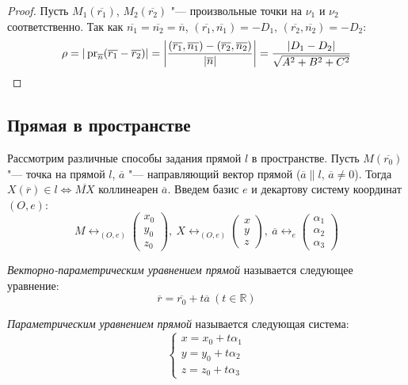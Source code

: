 \begin{proof}
	Пусть $M_1(\overline{r_1})$, $M_2(\overline{r_2})$ "--- произвольные точки на $\nu_1$ и $\nu_2$ соответственно. Так как $\overline{n_1} = \overline{n_2} = \overline{n}$, $(\overline{r_1}, \overline{n_1}) = -D_1$, $(\overline{r_2}, \overline{n_2}) = -D_2$:
	\[\rho = |\operatorname{pr}_{\overline{n}}(\overline{r_1} - \overline{r_2})| = \left|\frac{(\overline{r_1}, \overline{n_1}) - (\overline{r_2}, \overline{n_2})}{|\overline{n}|}\right| = \frac{|D_1 - D_2|}{\sqrt{A^2 + B^2 + C^2}}\]
\end{proof}

\subsection{Прямая в пространстве}

Рассмотрим различные способы задания прямой $l$ в пространстве. Пусть $M (\overline{r_0})$ "--- точка на прямой $l$, $\overline{a}$ "--- направляющий вектор прямой ($\overline{a} \parallel l$, $\overline{a} \ne 0$). Тогда $X (\overline{r}) \in l \Leftrightarrow \overline{MX} \text{ коллинеарен } \overline{a}$. Введем базис $e$ и декартову систему координат $(O, e)$:
\[M \leftrightarrow_{(O, e)}
\begin{pmatrix}
x_0\\y_0\\z_0
\end{pmatrix},~
X \leftrightarrow_{(O, e)}
\begin{pmatrix}
x\\y\\z
\end{pmatrix},~
\overline{a} \leftrightarrow_{e}
\begin{pmatrix}
\alpha_1\\\alpha_2\\\alpha_3
\end{pmatrix}\]

\begin{definition} \textit{Векторно-параметрическим уравнением прямой} называется следующее уравнение:
	\[\overline{r} = \overline{r_0} + t\overline{a}~(t \in \mathbb{R})\]
\end{definition}

\begin{definition} \textit{Параметрическим уравнением прямой} называется следующая система:
	\[\left\{
	\begin{aligned}
	x = x_0 + t\alpha_1\\
	y = y_0 + t\alpha_2\\
	z = z_0 + t\alpha_3
	\end{aligned}
	\right.
	\]
\end{definition}

